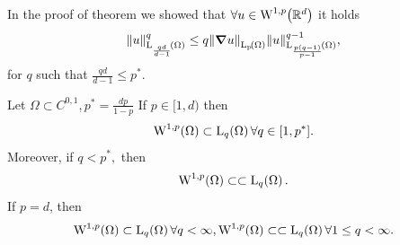 \documentclass{article}
\begin{document}
\begin{remark}
	In the proof of theorem we showed that $\forall u \in \WkpSet[1][p]{\R^d}$ it holds
	\[
		\norm{u}_{\LpSet[\frac{qd}{d-1}]{\Omega}}^q \leq q\norm{\grad u}_{\LpSet{\Omega}} \norm{u}_{\LpSet[\frac{p\qty(q-1)}{p-1}]{\Omega}}^{q-1},
	\]
	for $q$ such that $\frac{qd}{d-1}\leq p^{*}$.
\end{remark}


\begin{theorem}
	Let $\Omega \subset C^{0,1}, p^{*} = \frac{dp}{1-p}$ If $p \in [1,d)$ then
	\[
		\WkpSet[1][p]{\Omega} \subset \LpSet[q]{\Omega} \forall q \in [1,p^{*}].
	\]
	Moreover, if $q < p^{*}, $ then
	\[
		\WkpSet[1][p]{\Omega} \subset \subset \LpSet[q]{\Omega}.
	\]
	If $p=d$, then
	\[
		\WkpSet[1][p]{\Omega} \subset \LpSet[q]{\Omega} \forall q < \infty, \WkpSet[1][p]{\Omega} \subset \subset \LpSet[q]{\Omega} \forall 1 \leq q < \infty.
	\]
\end{theorem}
\end{document}
